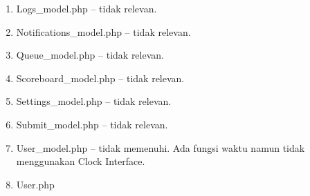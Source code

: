 \begin{enumerate}
	\item Logs\_model.php -- tidak relevan.
	\item Notifications\_model.php -- tidak relevan.
	\item Queue\_model.php -- tidak relevan.
	\item Scoreboard\_model.php -- tidak relevan.
	\item Settings\_model.php -- tidak relevan.
	\item Submit\_model.php -- tidak relevan.
	\item User\_model.php -- tidak memenuhi.
	Ada fungsi waktu namun tidak menggunakan Clock Interface.
	\item User.php
\end{enumerate}

